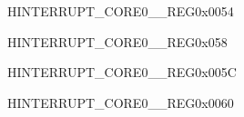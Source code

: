 \begin{register}{H}{INTERRUPT\_CORE0\_\_REG}{0x0054}\label{regdesc:INTERRUPTCORE0RTCCOREINTRMAPREG}






\end{register}\vspace{-3em}










\begin{register}{H}{INTERRUPT\_CORE0\_\_REG}{0x058}\label{regdesc:INTERRUPTCORE0I2CEXT0INTRMAPREG}






\end{register}\vspace{-3em}


















\begin{register}{H}{INTERRUPT\_CORE0\_\_REG}{0x005C}\label{regdesc:INTERRUPTCORE0TGT0INTMAPREG}






\end{register}\vspace{-3em}


\begin{register}{H}{INTERRUPT\_CORE0\_\_REG}{0x0060}\label{regdesc:INTERRUPTCORE0TGWDTINTMAPREG}






\end{register}\vspace{-3em}



























